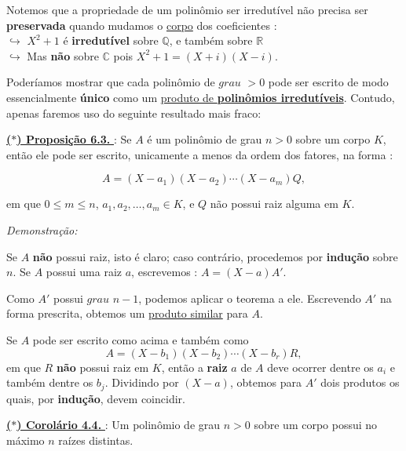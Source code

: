     \begin{exemplo}
        Notemos que a propriedade de um polinômio ser irredutível não precisa ser \textbf{preservada} quando mudamos o 
        \underline{corpo} dos coeficientes : \\ 
        $\hookrightarrow$ $X^2 + 1$ é \textbf{irredutível} sobre $\mathbb{Q}$, e também sobre $\mathbb{R}$ \\ 
        $\hookrightarrow$ Mas \textbf{não} sobre $\mathbb{C}$ pois $X^2 + 1 = (X+i)(X-i)$.    
    \end{exemplo}
    
    Poderíamos mostrar que cada polinômio de $grau$ $> 0$ pode ser escrito de 
    modo essencialmente \textbf{único} como um \underline{produto de \textbf{polinômios irredutíveis}}. Contudo, apenas faremos uso do
    seguinte resultado mais fraco:

    \underline{\underline{ \textbf{\textcolor{cinzaEscuro}{($\ast$) Proposição 6.3.}} }} : Se $A$ é um polinômio de grau $n > 0$ sobre um corpo $K$, então ele pode ser escrito,
    unicamente a menos da ordem dos fatores, na forma :
        
        \[
        A = (X - a_{1})(X - a_{2}) \cdots (X - a_{m})Q,
        \]
        
        em que $0 \leq m \leq n$, $a_{1}, a_{2}, \ldots, a_{m} \in K$, e $Q$ não possui raiz alguma em $K$.

    \textit{Demonstração:}  

        Se $A$ \textbf{não} possui raiz, isto é claro; caso contrário, procedemos por \textbf{indução} sobre $n$.  
        Se $A$ possui uma raiz $a$, escrevemos : $A = (X - a)A'$.

        Como $A'$ possui $grau$ $n - 1$, podemos aplicar o teorema a ele.  
        Escrevendo $A'$ na forma prescrita, obtemos um \underline{produto similar} para $A$.

        Se $A$ pode ser escrito como acima e também como
        \[
        A = (X - b_{1})(X - b_{2}) \cdots (X - b_{r})R,
        \]
        em que $R$ \textbf{não} possui raiz em $K$, então a \textbf{raiz} $a$ de $A$ deve ocorrer dentre os $a_i$ e também dentre os $b_j$.  
        Dividindo por $(X - a)$, obtemos para $A'$ dois produtos os quais, por \textbf{indução}, devem coincidir.

    \underline{\underline{ \textbf{\textcolor{cinzaEscuro}{($\ast$) Corolário 4.4.}} }} : Um polinômio de grau $n > 0$ sobre um corpo possui no máximo $n$ raízes distintas.
